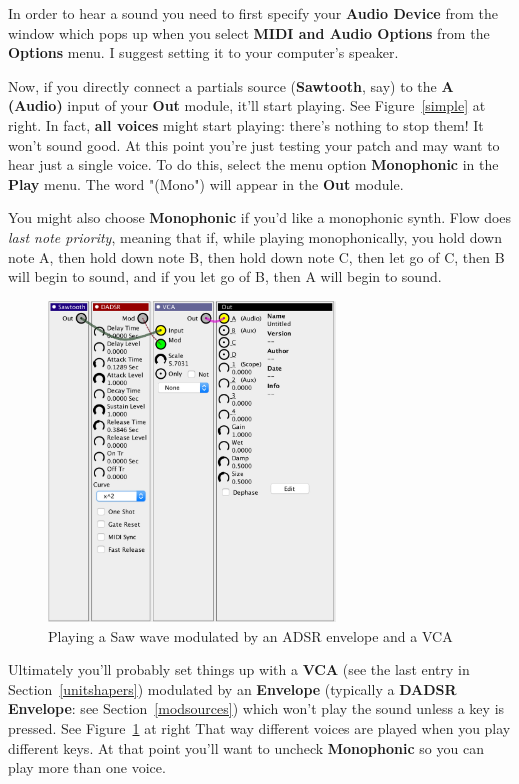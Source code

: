 \documentclass{article}
\begin{document}
In order to hear a sound you need to first specify your {\bf Audio Device} from the window which pops up when you select {\bf MIDI and Audio Options} from the {\bf Options} menu.  I suggest setting it to your computer's speaker.

Now, if you directly connect a partials source ({\bf Sawtooth}, say) to the {\bf A (Audio)} input of your {\bf Out} module, it'll start playing.  See Figure~\ref{simple} at right.  In fact, {\bf all voices} might start playing: there's nothing to stop them!  It won't sound good.   At this point you're just testing your patch and may want to hear just a single voice.  To do this, select the menu option {\bf Monophonic} in the {\bf Play} menu.  The word "(Mono") will appear in the {\bf Out} module.

You might also choose {\bf Monophonic} if you'd like a monophonic synth.  Flow does {\it last note priority}, meaning that if, while playing monophonically, you hold down note A, then hold down note B, then hold down note C, then let go of C, then B will begin to sound, and if you let go of B, then A will begin to sound.

\begin{figure}
\vspace{-1em}
\includegraphics[width=3in]{adsr}
\caption{Playing a Saw wave modulated by an ADSR envelope and a VCA}
\vspace{-2em}
\label{adsr}
\end{figure}

Ultimately you'll probably set things up with a {\bf VCA} (see the last entry in Section~\ref{unitshapers}) modulated by an {\bf Envelope} (typically a {\bf DADSR Envelope}: see Section~\ref{modsources}) which won't play the sound unless a key is pressed. See Figure~\ref{adsr} at right That way different voices are played when you play different keys.  At that point you'll want to uncheck {\bf Monophonic} so you can play more than one voice.
\end{document}
